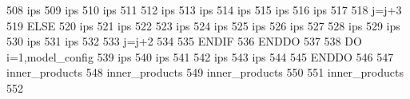 \begin{DoxyCode}
508         ips%
509         ips%
510         ips%
511 
512         ips%
513         ips%
514         ips%
515         ips%
516         ips%
517 
518         j=j+3
519       \textcolor{keywordflow}{ELSE}
520         ips%
521         ips%
522 
523         ips%
524         ips%
525         ips%
526         ips%
527 
528         ips%
529         ips%
530         ips%
531         ips%
532 
533         j=j+2
534 
535 \textcolor{keywordflow}{      ENDIF}
536 \textcolor{keywordflow}{    ENDDO}
537 
538     \textcolor{keywordflow}{DO} i=1,model\_config%
539       ips%
540       ips%
541 
542       ips%
543       ips%
544 
545 \textcolor{keywordflow}{    ENDDO}
546 
547     inner\_products%
548     inner\_products%
549     inner\_products%
550 
551     inner\_products%
552 
\end{DoxyCode}
